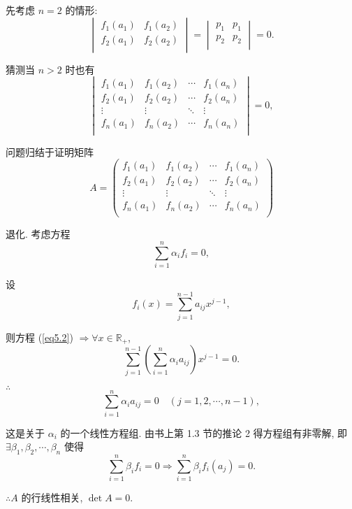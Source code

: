 \documentclass[color=black,device=normal,lang=cn,mode=geye]{elegantnote}
\begin{document}
\begin{solution}
    先考虑 $n=2$ 的情形:
    \[\begin{vmatrix}
        f_1(a_1) & f_1(a_2) \\
        f_2(a_1) & f_2(a_2) \\
    \end{vmatrix}=\begin{vmatrix}
        p_1 & p_1 \\
        p_2 & p_2 \\
    \end{vmatrix}=0.\]

    猜测当 $n>2$ 时也有
    \[\begin{vmatrix}
        f_1(a_1) & f_1(a_2) & \cdots & f_1(a_n) \\
        f_2(a_1) & f_2(a_2) & \cdots & f_2(a_n) \\
        \vdots & \vdots & \ddots & \vdots \\
        f_n(a_1) & f_n(a_2) & \cdots & f_n(a_n) \\
    \end{vmatrix}=0,\]

    问题归结于证明矩阵
    \[A=\begin{pmatrix}
        f_1(a_1) & f_1(a_2) & \cdots & f_1(a_n) \\
        f_2(a_1) & f_2(a_2) & \cdots & f_2(a_n) \\
        \vdots & \vdots & \ddots & \vdots \\
        f_n(a_1) & f_n(a_2) & \cdots & f_n(a_n) \\
    \end{pmatrix}\]

    退化. 考虑方程
    \begin{equation}\label{eq5.2}
        \sum\limits_{i=1}^n\alpha_if_i=0,
    \end{equation}

    设
    \[f_i(x)=\sum\limits_{j=1}^{n-1}a_{ij}x^{j-1},\]

    则方程 (\ref{eq5.2}) $\Rightarrow\forall x\in\mathbb{R}_+$,
    \[\sum\limits_{j=1}^{n-1}\left(\sum\limits_{i=1}^n\alpha_ia_{ij}\right)x^{j-1}=0.\]

    $\therefore$
    \[\sum\limits_{i=1}^n\alpha_ia_{ij}=0\quad(j=1,2,\cdots,n-1),\]

    这是关于 $\alpha_i$ 的一个线性方程组. 由书上第 1.3 节的推论 2 得方程组有非零解, 即 $\exists\beta_1,\beta_2,\cdots,\beta_n$ 使得
    \[\sum\limits_{i=1}^n\beta_if_i=0\Rightarrow\sum\limits_{i=1}^n\beta_if_i(a_j )=0.\]

    $\therefore A$ 的行线性相关, $\det A=0$.
\end{solution}
\end{document}

